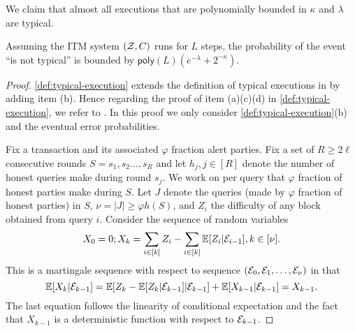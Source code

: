 We claim that almost all executions that are polynomially bounded in $\kappa$ and $\lambda$ are typical.

\begin{theorem} \label{thm:typical-execution}
    Assuming the ITM system $(\mathcal{Z}, C)$ runs for $L$ steps, the probability of the event ``\E is not typical'' is bounded by $\mathsf{poly}(L)(e^{-\lambda} + 2^{-\kappa})$.
\end{theorem}

\begin{proof}
    \cref{def:typical-execution} extends the definition of typical executions in \cite{EPRINT:GarKiaLeo20} by adding item (b).
    Hence regarding the proof of item (a)(c)(d) in \cref{def:typical-execution}, we refer to \cite{EPRINT:GarKiaLeo20}.
    In this proof we only consider \cref{def:typical-execution}(b) and the eventual error probabilities.

    Fix a transaction \tx and its associated $\varphi$ fraction alert parties.
    Fix a set of $R \ge 2\ell$ consecutive rounds $S = s_1, s_2 \ldots, s_R$ and let $h_j, j \in [R]$ denote the number of honest queries make during round $s_j$.
    We work on per query that $\varphi$ fraction of honest parties make during $S$.
    Let $J$ denote the queries (made by $\varphi$ fraction of honest parties) in $S$, $\nu = |J| \ge \varphi h(S)$, and $Z_i$ the difficulty of any block obtained from query $i$. Consider the sequence of random variables
    \[ X_0 = 0; X_k = \sum_{i \in [k]} Z_i - \sum_{i \in [k]} \mathbb{E} [Z_i | \mathcal{E}_{i - 1}], k \in [\nu]. \]
    This is a martingale sequence with respect to sequence $(\mathcal{E}_0, \mathcal{E}_1, \ldots, \mathcal{E}_\nu)$ in that
    \begin{equation*} \label{eq:martingale-details}
        \mathbb{E} [X_k | \mathcal{E}_{k - 1}] = \mathbb{E} [Z_k - \mathbb{E} [Z_k | \mathcal{E}_{k - 1}] | \mathcal{E}_{k - 1}] + \mathbb{E} [X_{k - 1} | \mathcal{E}_{k - 1}] = X_{k - 1}.
    \end{equation*}
    The last equation follows the linearity of conditional expectation and the fact that $ X_{k - 1}$ is a deterministic function with respect to $\mathcal{E}_{k - 1}$.


\end{proof}
